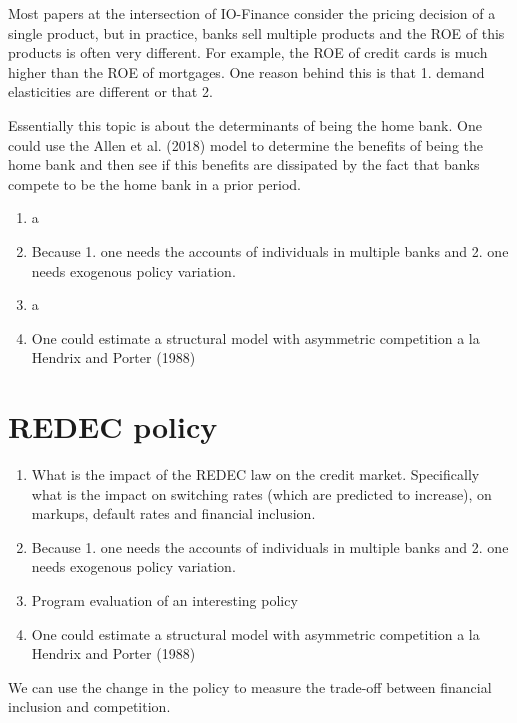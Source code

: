 \documentclass[12pt]{article}
\theoremstyle{plain}
\theoremstyle{plain}
\begin{document}
Most papers at the intersection of IO-Finance consider the pricing decision of a single product, but in practice, banks sell multiple products and the ROE of this products is often very different. For example, the ROE of credit cards is much higher than the ROE of mortgages. 
One reason behind this is that 1. demand elasticities are different or that 2. 


Essentially this topic is about the determinants of being the home bank. One could use the Allen et al. (2018) model to determine the benefits of being the home bank and then see if this benefits are dissipated by the fact that banks compete to be the home bank in a prior period. 

\begin{enumerate}
    \item a
    \item Because 1. one needs the accounts of individuals in multiple banks and 2. one needs exogenous policy variation. 
    \item a
    \item One could estimate a structural model with asymmetric competition a la Hendrix and Porter (1988) 
\end{enumerate}

\section*{REDEC policy}


\begin{enumerate}
    \item What is the impact of the REDEC law on the credit market. Specifically what is the impact on switching rates (which are predicted to increase), on markups, default rates and financial inclusion. 
    \item Because 1. one needs the accounts of individuals in multiple banks and 2. one needs exogenous policy variation. 
    \item Program evaluation of an interesting policy
    \item One could estimate a structural model with asymmetric competition a la Hendrix and Porter (1988) 
\end{enumerate}

We can use the change in the policy to measure the trade-off between financial inclusion and competition. 


\end{document}
